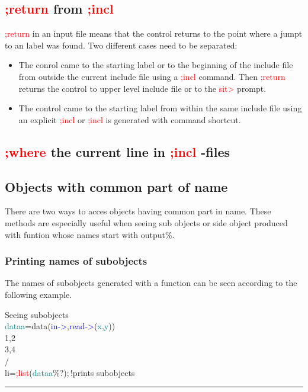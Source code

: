\subsection{\textcolor{Red}{;return} from \textcolor{Red}{;incl}} 
\label{inpureturn} 
\textcolor{Red}{;return} in an input file means that the control returns to the point where a 
jumpt to an label was found. Two different cases need to be separated: 
\begin{itemize} 
\item The conrol came to the starting label or to the beginning of the include file 
from outside the current include file using a \textcolor{Red}{;incl} command. Then \textcolor{Red}{;return} returns the control to upper level include 
file or to the \textcolor{Red}{sit>} prompt. 
\item The control came to the starting label from within the same include file using 
an explicit \textcolor{Red}{;incl} or \textcolor{Red}{;incl} is generated 
with command shortcut. 
\end{itemize} 
\subsection{\textcolor{Red}{;where} the current line in \textcolor{Red}{;incl} -files} 
\label{inpuwhere} 
\subsection{Objects with common part of name} 
\label{inpusubobj} 
There are two ways to acces objects having common part in name. These methods are especially useful 
when seeing sub objects or side object produced with funtion whose names start with output\%. 
\subsubsection{Printing names of subobjects} 
\label{inpusub1} 
The names of subobjects generated with a function can be seen according 
to the following example. 
\singlespacing 
\begin{example}[subobjex]Seeing subobjects\\ 
\label{subobjex} 
\noindent \textcolor{teal}{dataa}=\textcolor{VioletRed}{data}(\textcolor{blue}{in->},\textcolor{blue}{read->}(\textcolor{teal}{x},\textcolor{teal}{y}))\\ 
1,2\\ 
3,4\\ 
/  \\ 
li=\textcolor{Red}{;list}(\textcolor{teal}{dataa}\%?);\,{\color{ForestGreen}!prints subobjects}\\ 
\end{example} 
\vspace{-7mm} \rule{5cm}{0.1pt} 
\onehalfspacing 
